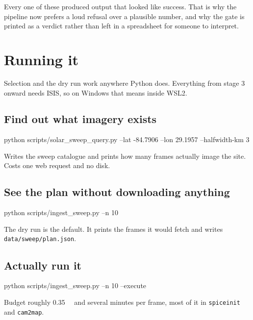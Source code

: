 \documentclass[11pt]{article}
\begin{document}
\begin{limitbox}
Every one of these produced output that looked like success. That is why the pipeline
now prefers a loud refusal over a plausible number, and why the gate is printed as a
verdict rather than left in a spreadsheet for someone to interpret.
\end{limitbox}

\section{Running it}

Selection and the dry run work anywhere Python does. Everything from stage 3 onward
needs ISIS, so on Windows that means inside WSL2.

\subsection{Find out what imagery exists}
\begin{cmdbox}\begin{cmdv}
python scripts/solar_sweep_query.py --lat -84.7906 --lon 29.1957 --halfwidth-km 3
\end{cmdv}
\end{cmdbox}
Writes the sweep catalogue and prints how many frames actually image the site. Costs one
web request and no disk.

\subsection{See the plan without downloading anything}
\begin{cmdbox}\begin{cmdv}
python scripts/ingest_sweep.py --n 10
\end{cmdv}
\end{cmdbox}
The dry run is the default. It prints the frames it would fetch and writes
\texttt{data/\allowbreak sweep/\allowbreak plan.json}.

\subsection{Actually run it}
\begin{cmdbox}\begin{cmdv}
python scripts/ingest_sweep.py --n 10 --execute
\end{cmdv}
\end{cmdbox}
Budget roughly \SI{0.35}{\giga\byte} and several minutes per frame, most of it in
\texttt{spiceinit} and \texttt{cam2map}.
\end{document}
